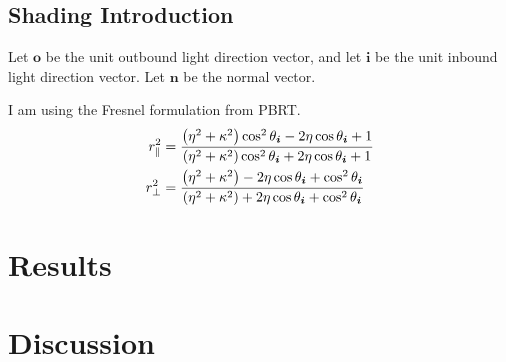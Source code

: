 \documentclass[12pt]{article}
\begin{document}
\subsection{Shading Introduction}
Let \(\bm o\) be the unit outbound light direction vector, and let \(\bm i\) be the unit inbound light direction vector.
Let \(\bm n\) be the normal vector.

I am using the Fresnel formulation from PBRT.
\begin{align*}
  r_{\parallel}^2 &= \frac{\del{\eta^2 + \kappa^2}\cos^2 \theta_{\bm i} - 2\eta \cos \theta_{\bm i} + 1}{\del{\eta^2 + \kappa^2}\cos^2 \theta_{\bm i} + 2\eta \cos \theta_{\bm i} + 1}\\
  r_{\perp}^2 &= \frac{\del{\eta^2 + \kappa^2} - 2\eta \cos \theta_{\bm i} + \cos^2 \theta_{\bm i}}{\del{\eta^2 + \kappa^2} + 2\eta \cos \theta_{\bm i} + \cos^2 \theta_{\bm i}}
\end{align*}

\section{Results}

\section{Discussion}
\end{document}
